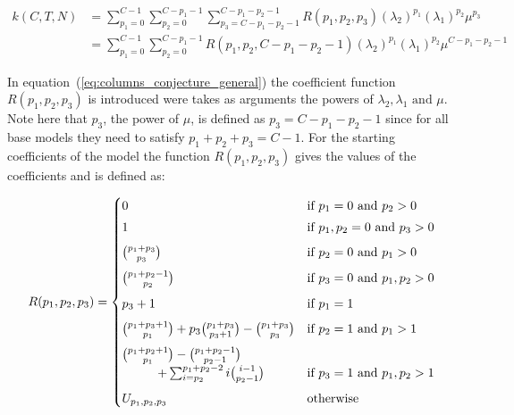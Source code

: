 \begin{align}\label{eq:columns_conjecture_general}
    k(C,T,N) &= \sum_{p_1=0}^{C-1} \sum_{p_2=0}^{C-p_1-1}
    \sum_{p_3=C - p_1 - p_2 - 1}^{C - p_1 - p_2 - 1} R(p_1, p_2, p_3)
    (\lambda_2)^{p_1} (\lambda_1)^{p_2} \mu^{p_3} \nonumber \\
    &= \sum_{p_1=0}^{C-1} \sum_{p_2=0}^{C-p_1-1} R(p_1, p_2, C-p_1-p_2-1)
    (\lambda_2)^{p_1} (\lambda_1)^{p_2} \mu^{C-p_1-p_2-1}
\end{align}

In equation~(\ref{eq:columns_conjecture_general}) the coefficient function
\(R(p_1,p_2,p_3)\) is introduced were takes as arguments the powers of
\(\lambda_2, \lambda_1 \text{ and } \mu\).
Note here that \(p_3\), the power of \(\mu\), is defined as \(p_3=C-p_1-p_2-1\)
since for all base models they need to satisfy \(p_1 + p_2 + p_3 = C-1\).
For the starting coefficients of the model the function \(R(p_1,p_2,p_3)\) gives
the values of the coefficients and is defined as:

\begin{equation} \label{eq:coefficient_function}
    R(p_1,p_2,p_3) =
    \begin{cases}
        0 & \text{if } p_1 = 0 \text{ and } p_2 > 0 \vspace{0.1cm} \\
        1 & \text{if } p_1, p_2 = 0 \text{ and } p_3 > 0 \vspace{0.2cm} \\
        \binom{p_1 + p_3}{p_3} & \text{if } p_2 = 0
        \text{ and } p_1 > 0 \vspace{0.2cm} \\
        \binom{p_1 + p_2 - 1}{p_2} & \text{if } p_3 = 0
        \text{ and } p_1, p_2 > 0 \vspace{0.2cm} \\
        p_3 + 1 & \text{if } p_1 = 1 \vspace{0.2cm} \\
        \binom{p_1 + p_3 + 1}{p_1} + p_3 \binom{p_1 + p_3}{p_3+1} -
        \binom{p_1 + p_3}{p_3} & \text{if } p_2 = 1
        \text{ and } p_1 > 1 \vspace{0.2cm} \\
        \binom{p_1 + p_2 + 1}{p_1} - \binom{p_1 + p_2 - 1}{p_2-1} & \\
        \hspace{1cm} + \sum_{i=p_2}^{p_1 + p_2 - 2} i \binom{i-1}{p_2 - 1} &
        \text{if } p_3 = 1
        \text{ and } p_1,p_2 > 1 \vspace{0.2cm} \\
        U_{p_1,p_2,p_3} & \text{otherwise}
    \end{cases}
\end{equation}

